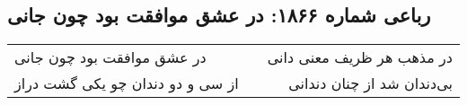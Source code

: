 \begin{center}
\section*{رباعی شماره ۱۸۶۶: در عشق موافقت بود چون جانی}
\label{sec:1866}
\begin{longtable}{l p{0.5cm} r}
در عشق موافقت بود چون جانی
&&
در مذهب هر ظریف معنی دانی
\\
از سی و دو دندان چو یکی گشت دراز
&&
بی‌دندان شد از چنان دندانی
\\
\end{longtable}
\end{center}
